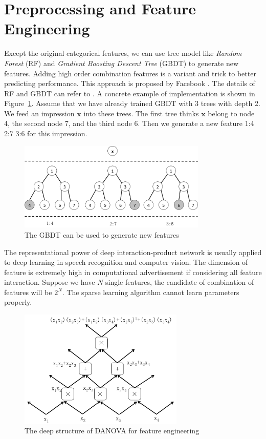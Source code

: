 \section{Preprocessing and Feature Engineering}

Except the original categorical features, we can use tree model like \emph{Random Forest} (RF) and \emph{Gradient Boosting Descent Tree} (GBDT) to generate new features. Adding high order combination features is a variant and trick to better predicting performance. This approach is proposed by Facebook \cite{xinranhejunfengpanetc2014}. The details of RF and GBDT can refer to \cite{jeromeh.friedman1999}. A concrete example of implementation is shown in Figure~\ref{fig:GBDT}. Assume that we have already trained GBDT with 3 trees with depth 2. We feed an impression $\mathbf{x}$ into these trees. The first tree thinks $\mathbf{x}$ belong to node 4, the second node 7, and the third node 6. Then we generate a new feature 1:4 2:7 3:6 for this impression.

\begin{figure}[htbp]
\centering
\includegraphics[width=0.8\textwidth]{GBDT.png}
\caption{The GBDT can be used to generate new features}
\label{fig:GBDT}
\end{figure}

The representational power of deep interaction-product network is usually applied to deep learning in speech recognition and computer vision. The dimension of feature is extremely high in computational advertisement if considering all feature interaction. Suppose we have $N$ single features, the candidate of combination of features will be $2^{N}$. The sparse learning algorithm cannot learn parameters properly. 

\begin{figure}[htbp]
\centering
\includegraphics[width=0.7\textwidth]{DANOVA.png}
\caption{The deep structure of DANOVA for feature engineering}
\label{fig:DANOVA}
\end{figure}

